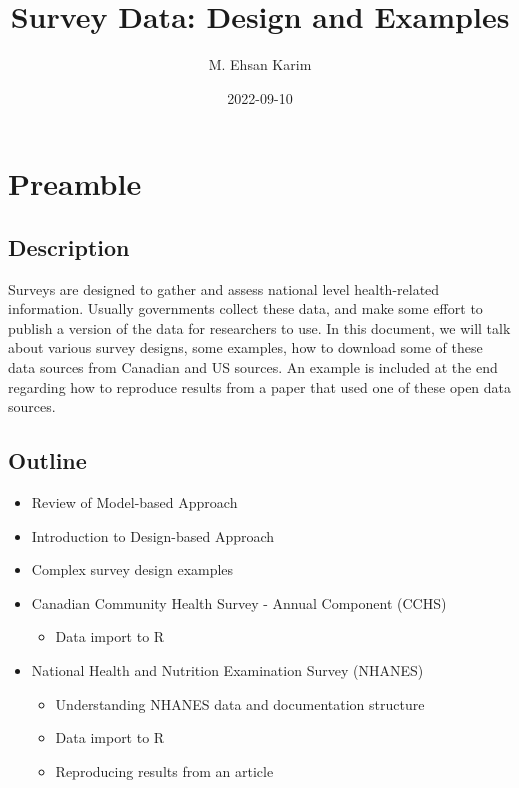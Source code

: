 \documentclass[
]{book}
\title{Survey Data: Design and Examples}
\author{M. Ehsan Karim}
\date{2022-09-10}
\providecommand{\tightlist}{%
  \setlength{\itemsep}{0pt}\setlength{\parskip}{0pt}}
\begin{document}
\maketitle

{
\setcounter{tocdepth}{1}
\tableofcontents
}
\hypertarget{preamble}{%
\chapter*{Preamble}\label{preamble}}

\hypertarget{description}{%
\section*{Description}\label{description}}

Surveys are designed to gather and assess national level health-related information. Usually governments collect these data, and make some effort to publish a version of the data for researchers to use. In this document, we will talk about various survey designs, some examples, how to download some of these data sources from Canadian and US sources. An example is included at the end regarding how to reproduce results from a paper that used one of these open data sources.

\hypertarget{outline}{%
\section*{Outline}\label{outline}}

\begin{itemize}
\tightlist
\item
  Review of Model-based Approach
\item
  Introduction to Design-based Approach
\item
  Complex survey design examples
\item
  Canadian Community Health Survey - Annual Component (CCHS)

  \begin{itemize}
  \tightlist
  \item
    Data import to R
  \end{itemize}
\item
  National Health and Nutrition Examination Survey (NHANES)

  \begin{itemize}
  \tightlist
  \item
    Understanding NHANES data and documentation structure
  \item
    Data import to R
  \item
    Reproducing results from an article
  \end{itemize}
\end{itemize}
\end{document}
